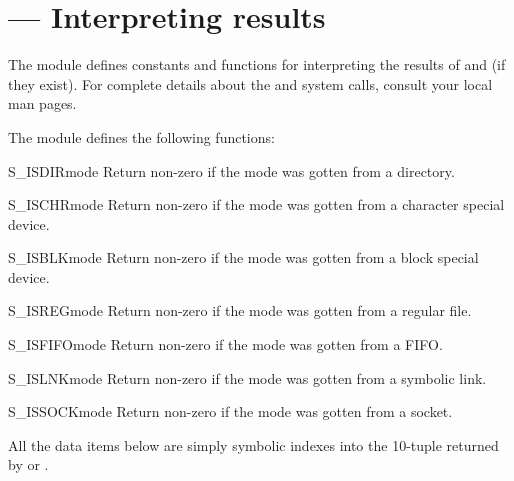 \section{ ---
         Interpreting  results}



The  module defines constants and functions for
interpreting the results of  and
 (if they exist).  For complete details about the
 and  system calls, consult your
local man pages.

The  module defines the following functions:


\begin{funcdesc}{S_ISDIR}{mode}
Return non-zero if the mode was gotten from a directory.
\end{funcdesc}

\begin{funcdesc}{S_ISCHR}{mode}
Return non-zero if the mode was gotten from a character special device.
\end{funcdesc}

\begin{funcdesc}{S_ISBLK}{mode}
Return non-zero if the mode was gotten from a block special device.
\end{funcdesc}

\begin{funcdesc}{S_ISREG}{mode}
Return non-zero if the mode was gotten from a regular file.
\end{funcdesc}

\begin{funcdesc}{S_ISFIFO}{mode}
Return non-zero if the mode was gotten from a FIFO.
\end{funcdesc}

\begin{funcdesc}{S_ISLNK}{mode}
Return non-zero if the mode was gotten from a symbolic link.
\end{funcdesc}

\begin{funcdesc}{S_ISSOCK}{mode}
Return non-zero if the mode was gotten from a socket.
\end{funcdesc}

All the data items below are simply symbolic indexes into the 10-tuple
returned by  or .  

